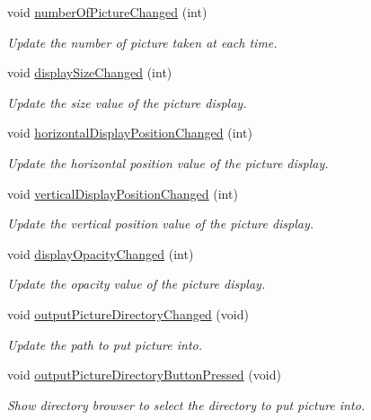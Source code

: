 \begin{DoxyCompactItemize}
void \hyperlink{class_autoscope_window_form_afa0e563f29e92ef54caf172e6bdd53e2}{number\+Of\+Picture\+Changed} (int)
\begin{DoxyCompactList}\small\item\em Update the number of picture taken at each time. \end{DoxyCompactList}\item 
void \hyperlink{class_autoscope_window_form_a20119c95db0bc44f6e7fffc49f230af0}{display\+Size\+Changed} (int)
\begin{DoxyCompactList}\small\item\em Update the size value of the picture display. \end{DoxyCompactList}\item 
void \hyperlink{class_autoscope_window_form_a084c9da4dd3374105e3dd0302e5db578}{horizontal\+Display\+Position\+Changed} (int)
\begin{DoxyCompactList}\small\item\em Update the horizontal position value of the picture display. \end{DoxyCompactList}\item 
void \hyperlink{class_autoscope_window_form_a775044eeb0c9bf094512c82d2c538ad0}{vertical\+Display\+Position\+Changed} (int)
\begin{DoxyCompactList}\small\item\em Update the vertical position value of the picture display. \end{DoxyCompactList}\item 
void \hyperlink{class_autoscope_window_form_ac76b6ed3d0bd679c7342eb15bf217418}{display\+Opacity\+Changed} (int)
\begin{DoxyCompactList}\small\item\em Update the opacity value of the picture display. \end{DoxyCompactList}\item 
void \hyperlink{class_autoscope_window_form_ac44f36cc4ccc68c6109d1c18ab7ba107}{output\+Picture\+Directory\+Changed} (void)
\begin{DoxyCompactList}\small\item\em Update the path to put picture into. \end{DoxyCompactList}\item 
void \hyperlink{class_autoscope_window_form_a429d5bdc1f4d7d673e5ae85692e2b67f}{output\+Picture\+Directory\+Button\+Pressed} (void)
\begin{DoxyCompactList}\small\item\em Show directory browser to select the directory to put picture into. \end{DoxyCompactList}\item 

\end{DoxyCompactItemize}
